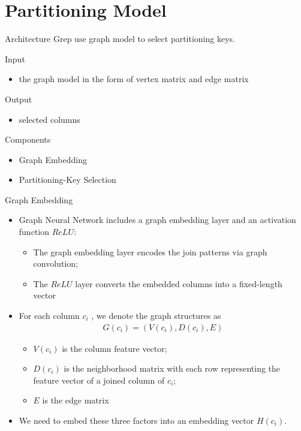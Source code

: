 \documentclass{beamer}
\begin{document}
\section{Partitioning Model}
\begin{frame}{Architecture}
    Grep use graph model to select partitioning keys.

    \begin{exampleblock}{Input}
        \begin{itemize}
            \item the graph model in the form of vertex matrix and edge matrix
        \end{itemize}
    \end{exampleblock}
    \begin{exampleblock}{Output}
        \begin{itemize}
            \item selected columns
        \end{itemize}
    \end{exampleblock}
    \begin{exampleblock}{Components}
        \begin{itemize}
            \item Graph Embedding
            \item Partitioning-Key Selection
        \end{itemize}
    \end{exampleblock}
\end{frame}

\begin{frame}{Graph Embedding}
    \begin{itemize}
        \item Graph Neural Network includes a graph embedding layer and an activation function $ReLU$:
        \begin{itemize}
            \item The graph embedding layer encodes the join patterns via graph convolution;
            \item The $ReLU$ layer converts the embedded columns into a fixed-length vector
        \end{itemize}
        \item For each column $c_i$ , we denote the graph structures as
            \begin{align}
                G(c_i ) = (V (c_i ), D(c_i ), E)\nonumber
            \end{align}
            \begin{itemize}
                \item $V (c_i )$ is the column feature vector;
                \item $D(c_i )$ is the neighborhood matrix with each row representing the feature vector of a joined column of $c_i$;
                \item $E$ is the edge matrix
            \end{itemize}
        \item We need to embed these three factors into an embedding vector $H (c_i )$.
    \end{itemize}
\end{frame}
\end{document}
